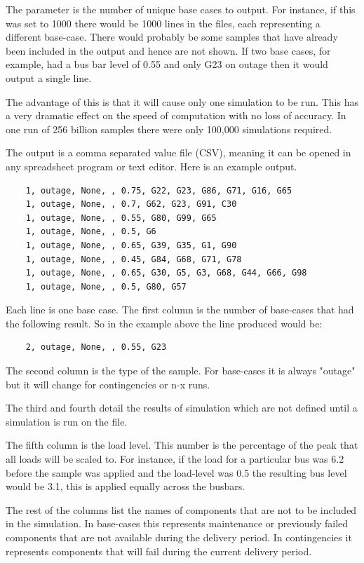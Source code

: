 \documentclass[a4paper,oneside,12pt]{report}
\begin{document}
The parameter is the number of unique base cases to output. For instance, if this was set to 1000 there would be 1000 lines in the files, each representing a different base-case. There would probably be some samples that have already been included in the output and hence are not shown. If two base cases, for example, had a bus bar level of 0.55 and only G23 on outage then it would output a single line.

The advantage of this is that it will cause only one simulation to be run. This has a very dramatic effect on the speed of computation with no loss of accuracy. In one run of 256 billion samples there were only 100,000 simulations required.

The output is a comma separated value file (CSV), meaning it can be opened in any spreadsheet program or text editor. Here is an example output.

\begin{verbatim}
    1, outage, None, , 0.75, G22, G23, G86, G71, G16, G65
    1, outage, None, , 0.7, G62, G23, G91, C30
    1, outage, None, , 0.55, G80, G99, G65
    1, outage, None, , 0.5, G6
    1, outage, None, , 0.65, G39, G35, G1, G90
    1, outage, None, , 0.45, G84, G68, G71, G78
    1, outage, None, , 0.65, G30, G5, G3, G68, G44, G66, G98
    1, outage, None, , 0.5, G80, G57
\end{verbatim}

Each line is one base case. The first column is the number of base-cases that had the following result. So in the example above the line produced would be:

\begin{verbatim}
    2, outage, None, , 0.55, G23
\end{verbatim}

The second column is the type of the sample. For base-cases it is always "outage" but it will change for contingencies or n-x runs.

The third and fourth detail the results of simulation which are not defined until a simulation is run on the file.

The fifth column is the load level. This number is the percentage of the peak that all loads will be scaled to. For instance, if the load for a particular bus was 6.2 before the sample was applied and the load-level was 0.5 the resulting bus level would be 3.1, this is applied equally across the busbars.

The rest of the columns list the names of components that are not to be included in the simulation. In base-cases this represents maintenance or previously failed components that are not available during the delivery period. In contingencies it represents components that will fail during the current delivery period.
\end{document}
